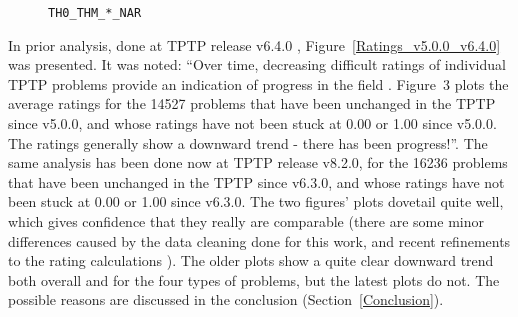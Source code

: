\documentclass[runningheads]{llncs}
\begin{document}
\begin{figure}[h!]
\begin{minipage}[t]{.49\textwidth}
  \vspace*{-2em}
  \caption{{\tt TH0\_THM\_*\_NAR}}
  \label{Plot_TH0_THM_NAR}
\end{minipage}
\end{figure}

In prior analysis, done at TPTP release v6.4.0 \cite{Sut17}, Figure~\ref{Ratings_v5.0.0_v6.4.0} 
was presented. 
It was noted: ``Over time, decreasing difficult ratings of individual TPTP problems provide an 
indication of progress in the field \cite{SFS01}. Figure~3 plots the average ratings for the 
14527 problems that have been unchanged in the TPTP since v5.0.0, and whose ratings have not 
been stuck at 0.00 or 1.00 since v5.0.0. The ratings generally show a downward trend - there 
has been progress!''.
The same analysis has been done now at TPTP release v8.2.0, for the 16236 problems that have been 
unchanged in the TPTP since v6.3.0, and whose ratings have not been stuck at 0.00 or 1.00 since 
v6.3.0.
The two figures' plots dovetail quite well, which gives confidence that they really are comparable
(there are some minor differences caused by the data cleaning done for this work, and recent 
refinements to the rating calculations \cite{SD23-CASC,SD24-CASC}).
The older plots show a quite clear downward trend both overall and for the four types of problems,
but the latest plots do not.
The possible reasons are discussed in the conclusion (Section~\ref{Conclusion}).
\end{document}
